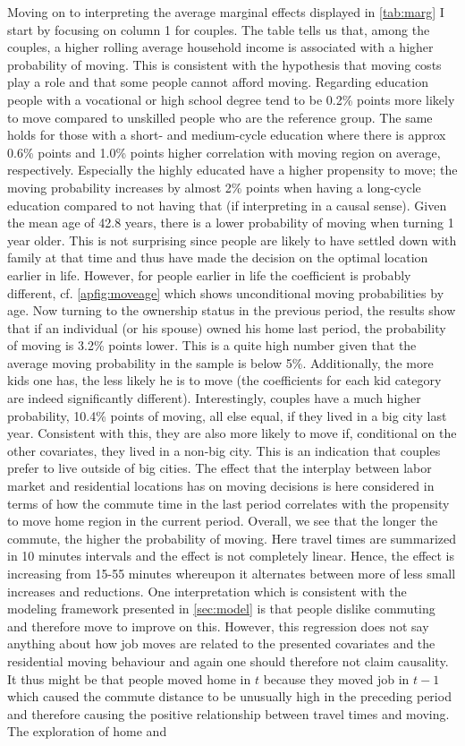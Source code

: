 Moving on to interpreting the average marginal effects displayed in \autoref{tab:marg} I start by focusing on column 1 for couples. The table tells us that, among the couples, a higher rolling average household income is associated with a higher probability of moving. This is consistent with the hypothesis that moving costs play a role and that some people cannot afford moving. Regarding education people with a vocational or high school degree tend to be 0.2\% points more likely to move compared to unskilled people who are the reference group. The same holds for those with a short- and medium-cycle education where there is approx 0.6\% points and 1.0\% points higher correlation with moving region on average, respectively. Especially the highly educated have a higher propensity to move; the moving probability increases by almost 2\% points when having a long-cycle education compared to not having that (if interpreting in a causal sense). Given the mean age of 42.8 years, there is a lower probability of moving when turning 1 year older. This is not surprising since people are likely to have settled down with family at that time and thus have made the decision on the optimal location earlier in life. However, for people earlier in life the coefficient is probably different, cf. \autoref{apfig:moveage}  which shows unconditional moving probabilities by age. Now turning to the ownership status in the previous period, the results show that if an individual (or his spouse) owned his home last period, the probability of moving is 3.2\% points lower. This is a quite high number given that the average moving probability in the sample is below 5\%. Additionally, the more kids one has, the less likely he is to move (the coefficients for each kid category are indeed significantly different). Interestingly, couples have a much higher probability, 10.4\% points of moving, all else equal, if they lived in a big city last year. Consistent with this, they are also more likely to move if, conditional on the other covariates, they lived in a non-big city. This is an indication that couples prefer to live outside of big cities. The effect that the interplay between labor market and residential locations has on moving decisions is here considered in terms of how the commute time in the last period correlates with the propensity to move home region in the current period. Overall, we see that the longer the commute, the higher the probability of moving. Here travel times are summarized in 10 minutes intervals and the effect is not completely linear. Hence, the effect is increasing from 15-55 minutes whereupon it alternates between more of less small increases and reductions. One interpretation which is consistent with the modeling framework presented in \autoref{sec:model} is that people dislike commuting and therefore move to improve on this. However, this regression does not say anything about how job moves are related to the presented covariates and the residential moving behaviour and again one should therefore not claim causality. It thus might be that people moved home in $t$ because they moved job in $t-1$ which caused the commute distance to be unusually high in the preceding period and therefore causing the positive relationship between travel times and moving. The exploration of home and 